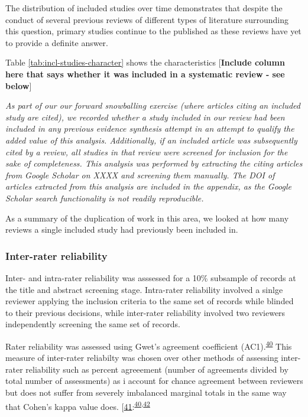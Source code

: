 \documentclass[a4paper, twoside]{templates/ociamthesis}
\begin{document}
The distribution of included studies over time demonstrates that despite the conduct of several previous reviews of different types of literature surrounding this question, primary studies continue to the published as these reviews have yet to provide a definite answer.

Table \ref{tab:incl-studies-character} shows the characteristics {[}\textbf{Include column here that says whether it was included in a systematic review - see below}{]}

\emph{As part of our our forward snowballing exercise (where articles citing an included study are cited), we recorded whether a study included in our review had been included in any previous evidence synthesis attempt in an attempt to qualify the added value of this analysis. Additionally, if an included article was subsequently cited by a review, all studies in that review were screened for inclusion for the sake of completeness. This analysis was performed by extracting the citing articles from Google Scholar on XXXX and screening them manually. The DOI of articles extracted from this analysis are included in the appendix, as the Google Scholar search functionality is not readily reproducible.}

As a summary of the duplication of work in this area, we looked at how many reviews a single included study had previously been included in.

\hypertarget{inter-rater-reliability}{%
\subsubsection{Inter-rater reliability}\label{inter-rater-reliability}}

Inter- and intra-rater reliability was asssessed for a 10\% subsample of records at the title and abstract screening stage. Intra-rater reliability involved a sinlge reviewer applying the inclusion criteria to the same set of records while blinded to their previous decisions, while inter-rater reliability involved two reviewers independently screening the same set of records.

Rater reliability was assessed using Gwet's agreement coefficient (AC1).\textsuperscript{\protect\hyperlink{ref-gwet2008}{40}} This measure of inter-rater reliabilty was chosen over other methods of assessing inter-rater reliability such as percent agreeement (number of agreements divided by total number of assessments) as i account for chance agreement between reviewers but does not suffer from severely imbalanced marginal totals in the same way that Cohen's kappa value does. {[}\protect\hyperlink{ref-cohen1960}{41}:\textsuperscript{\protect\hyperlink{ref-gwet2008}{40},\protect\hyperlink{ref-wongpakaran2013}{42}}
\end{document}

